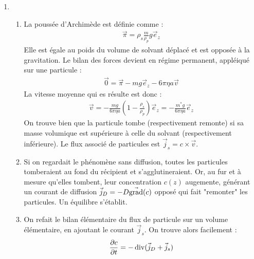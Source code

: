 \newpage

\begin{correction}

\begin{enumerate}

\item

\begin{enumerate}
	
	\item La poussée d'Archimède est définie comme :
	\begin{align*}
		\vec{\pi}=\rho_s\frac{m}{\rho_p}g\vec{e}_z
	\end{align*}
	Elle est égale au poids du volume de solvant déplacé et est opposée à la gravitation. 
	Le bilan des forces devient en régime permanent, appléiqué sur une particule :
	\begin{align*}
		\vec{0} = \vec{\pi} -mg\vec{e}_z-6\pi\eta a\vec{v}
	\end{align*}
	La vitesse moyenne qui es résulte est donc :
	\begin{align*}
		\vec{v} = -\frac{mg}{6\pi\eta a}\left(1-\frac{\rho_s}{\rho_p} \right)\vec{e}_z=-\frac{m^*g}{6\pi\eta a}\vec{e}_z
	\end{align*}
	On trouve bien que la particule tombe (respectivement remonte) si sa masse volumique est supérieure à celle du solvant (respectivement inférieure).
	Le flux associé de particules est $\vec{j}_s=c\times\vec{v}$.
	
	\item Si on regardait le phénomène sans diffusion, toutes les particules tomberaient au fond du récipient et s'agglutineraient. Or, au fur et à mesure qu'elles tombent, leur concentration $c(z)$ augemente, générant un courant de diffusion $\vec{j}_D=-D\vec{\mathop{}\!\mathrm{grad}}(c)$ opposé qui fait "remonter" les particules. Un équilibre s'établit.
	
	\item On refait le bilan élémentaire du flux de particule sur un volume élémentaire, en ajoutant le courant $\vec{j}_s$. On trouve alors facilement :
	\begin{align*}
		\frac{\partial c}{\partial t}=-\mathop{}\!\mathrm{div}(\vec{j}_D+\vec{j}_s)
	\end{align*}
	

\end{enumerate}
\end{enumerate}
\end{correction}
